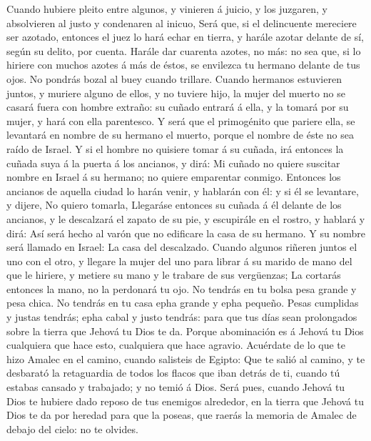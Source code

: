  Cuando hubiere pleito entre algunos, y vinieren á juicio,
y los juzgaren, y absolvieren al justo y condenaren al inicuo,
 Será que, si el delincuente mereciere ser azotado,
entonces el juez lo hará echar en tierra, y harále azotar delante de sí,
según su delito, por cuenta.  Harále dar cuarenta azotes,
no más: no sea que, si lo hiriere con muchos azotes á más de éstos, se
envilezca tu hermano delante de tus ojos.  No pondrás
bozal al buey cuando trillare.  Cuando hermanos estuvieren
juntos, y muriere alguno de ellos, y no tuviere hijo, la mujer del
muerto no se casará fuera con hombre extraño: su cuñado entrará á ella,
y la tomará por su mujer, y hará con ella parentesco.  Y
será que el primogénito que pariere ella, se levantará en nombre de su
hermano el muerto, porque el nombre de éste no sea raído de Israel.
 Y si el hombre no quisiere tomar á su cuñada, irá
entonces la cuñada suya á la puerta á los ancianos, y dirá: Mi cuñado no
quiere suscitar nombre en Israel á su hermano; no quiere emparentar
conmigo.  Entonces los ancianos de aquella ciudad lo harán
venir, y hablarán con él: y si él se levantare, y dijere, No quiero
tomarla,  Llegaráse entonces su cuñada á él delante de los
ancianos, y le descalzará el zapato de su pie, y escupirále en el
rostro, y hablará y dirá: Así será hecho al varón que no edificare la
casa de su hermano.  Y su nombre será llamado en Israel:
La casa del descalzado.  Cuando algunos riñeren juntos el
uno con el otro, y llegare la mujer del uno para librar á su marido de
mano del que le hiriere, y metiere su mano y le trabare de sus
vergüenzas;  La cortarás entonces la mano, no la
perdonará tu ojo.  No tendrás en tu bolsa pesa grande y
pesa chica.  No tendrás en tu casa epha grande y epha
pequeño.  Pesas cumplidas y justas tendrás; epha cabal y
justo tendrás: para que tus días sean prolongados sobre la tierra que
Jehová tu Dios te da.  Porque abominación es á Jehová tu
Dios cualquiera que hace esto, cualquiera que hace agravio.
 Acuérdate de lo que te hizo Amalec en el camino, cuando
salisteis de Egipto:  Que te salió al camino, y te
desbarató la retaguardia de todos los flacos que iban detrás de ti,
cuando tú estabas cansado y trabajado; y no temió á Dios.
 Será pues, cuando Jehová tu Dios te hubiere dado reposo
de tus enemigos alrededor, en la tierra que Jehová tu Dios te da por
heredad para que la poseas, que raerás la memoria de Amalec de debajo
del cielo: no te olvides.

